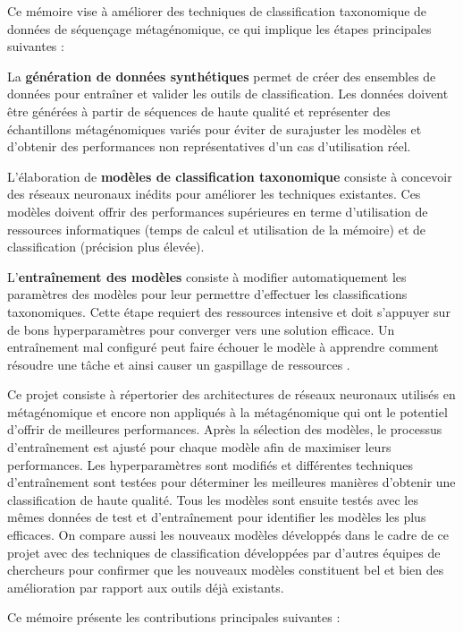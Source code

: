 \begin{introduction}
Ce mémoire vise à améliorer des techniques de classification taxonomique de données de séquençage
métagénomique, ce qui implique les étapes principales suivantes :

La \textbf{génération de données synthétiques} permet de créer des ensembles de données pour
entraîner et valider les outils de classification. Les données doivent être générées à partir de
séquences de haute qualité et représenter des échantillons métagénomiques variés pour éviter de
surajuster les modèles et d'obtenir des performances non représentatives d'un cas d'utilisation
réel.

L'élaboration de \textbf{modèles de classification taxonomique} consiste à concevoir des réseaux
neuronaux inédits pour améliorer les techniques existantes. Ces modèles doivent offrir des
performances supérieures en terme d'utilisation de ressources informatiques (temps de calcul et
utilisation de la mémoire) et de classification (précision plus élevée).

L'\textbf{entraînement des modèles} consiste à modifier automatiquement les paramètres des modèles
pour leur permettre d'effectuer les classifications taxonomiques. Cette étape requiert des
ressources intensive et doit s'appuyer sur de bons hyperparamètres pour converger vers une solution
efficace. Un entraînement mal configuré peut faire échouer le modèle à apprendre comment résoudre
une tâche et ainsi causer un gaspillage de ressources \cite{liu-etal-2020-understanding}.

Ce projet consiste à répertorier des architectures de réseaux neuronaux utilisés en métagénomique et
encore non appliqués à la métagénomique qui ont le potentiel d'offrir de meilleures performances.
Après la sélection des modèles, le processus d'entraînement est ajusté pour chaque modèle afin de
maximiser leurs performances. Les hyperparamètres sont modifiés et différentes techniques
d'entraînement sont testées pour déterminer les meilleures manières d'obtenir une classification de
haute qualité. Tous les modèles sont ensuite testés avec les mêmes données de test et d'entraînement
pour identifier les modèles les plus efficaces. On compare aussi les nouveaux modèles développés
dans le cadre de ce projet avec des techniques de classification développées par d'autres équipes de
chercheurs pour confirmer que les nouveaux modèles constituent bel et bien des amélioration par
rapport aux outils déjà existants.

Ce mémoire présente les contributions principales suivantes :


\end{introduction}
